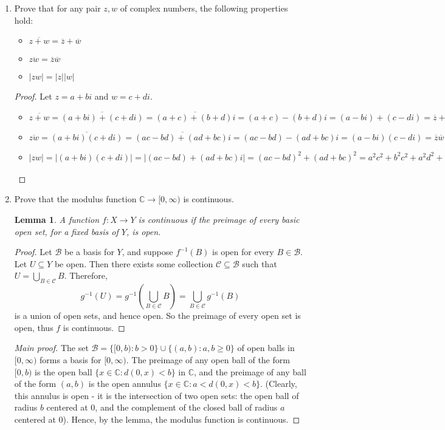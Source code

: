 \documentclass[10pt]{article}
\newcommand{\C}{\mathbb{C}}
\renewcommand{\bar}{\overline}
\newtheorem*{lem}{Lemma}
\begin{document}
\begin{enumerate}

\item Prove that for any pair $z,w$ of complex numbers, the following properties hold:
\begin{itemize}
\item $\bar{z+w} = \bar{z} + \bar{w}$
\item $\bar{zw} = \bar{z}\bar{w}$
\item $|zw| = |z||w|$
\end{itemize}

\begin{proof}
Let $z = a+bi$ and $w = c+di$.
\begin{itemize}
\item $\bar{z+w} = \bar{(a+bi) + (c+di)} = \bar{(a+c) + (b+d)i} = (a+c) - (b+d)i = (a - bi) + (c-di) = \bar{z} + \bar{w}$
\item $\bar{zw} = \bar{(a+bi)(c+di)} = \bar{(ac - bd) + (ad + bc)i} = (ac - bd) - (ad+bc)i = (a-bi)(c-di) = \bar{z}\bar{w}$
\item $|zw| = |(a+bi)(c+di)| = |(ac-bd) + (ad+bc)i| = (ac-bd)^2 + (ad+bc)^2 = a^2 c^2+b^2 c^2+a^2 d^2+b^2 d^2 = (a^2 + b^2)(c^2+d^2) = |a+bi| |c+di| = |z||w|$
\end{itemize}
\end{proof}




\item Prove that the modulus function $\C \rightarrow [0,\infty)$ is continuous.


\begin{lem}
A function $f:X \rightarrow Y$ is continuous if the preimage of every basic open set, for a fixed basis of $Y$, is open.
\end{lem}

\begin{proof}
Let $\mathcal{B}$ be a basis for $Y$, and suppose $f^{-1}(B)$ is open for every $B \in \mathcal{B}$.  Let $U \subseteq Y$ be open.  Then there exists some collection $\mathcal{C} \subseteq \mathcal{B}$ such that $U = \bigcup_{B \in \mathcal{C}} B$.  Therefore,
$$
g^{-1}(U) = g^{-1}(\bigcup_{B \in \mathcal{C}} B) = \bigcup_{B \in \mathcal{C}} g^{-1}(B)
$$
is a union of open sets, and hence open.  So the preimage of every open set is open, thus $f$ is continuous.
\end{proof}
\begin{proof}[Main proof]
The set $\mathcal{B} = \{ [0, b) : b > 0\} \cup \{ (a, b) : a,b \geq 0 \}$ of open balls in $[0,\infty)$ forms a basis for $[0,\infty)$.  The preimage of any open ball of the form $[0,b)$ is the open ball $\{x \in \C : d(0,x) < b \}$ in $\C$, and the preimage of any ball of the form $(a,b)$ is the open annulus $\{ x \in \C : a < d(0,x) < b \}$.  (Clearly, this annulus is open - it is the intersection of two open sets: the open ball of radius $b$ centered at $0$, and the complement of the closed ball of radius $a$ centered at $0$).  Hence, by the lemma, the modulus function is continuous.
\end{proof}


\end{enumerate}
\end{document}
